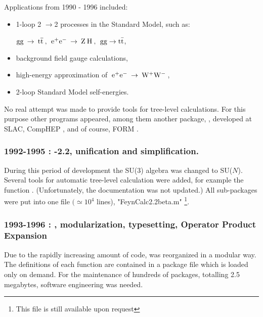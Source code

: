Applications from 1990 - 1996  included:

\begin{itemize}

\item 1-loop 2 \(\rightarrow \)2 processes in the Standard
Model, such as:

\({\rm gg}\> \rightarrow \> 
{\rm t \overline{t}} \> , \> \>
{{\rm e}^+}{{\rm e}^-}\> \rightarrow \> {\rm Z}\> {\rm H}\>, \> \>
{\rm gg} \rightarrow {\rm t\bar{t}} \),

\item background field gauge calculations,

\item high-energy approximation of \(\>{{\rm e}^+}
{{\rm e}^-}\> \rightarrow \> {{\rm W}^+}{{\rm W}^-}\> \),

\item  2-loop Standard Model self-energies.

\end{itemize}

No real attempt was made to provide tools for tree-level calculations.
For this purpose other programs appeared, among them another  \mma package, \hip \cite{yeh}, developed at SLAC, 
CompHEP \cite{Pukhov:1999gg}, and of course, FORM \cite{Vermaseren:2000nd}.

\subsubsection*{1992-1995 : -2.2, unification and simplification.}

During this period of development the SU(3) algebra was changed to SU($N$). Several tools for
automatic tree-level calculation were added, for example the function .
(Unfortunately, the  documentation was not updated.) All sub-packages were put into one file
\(\big(\simeq {{10}^4}\) lines), "FeynCalc2.2beta.m" \footnote{This file is still available upon
request}.

\subsubsection*{1993-1996 : , modularization, typesetting, Operator Product Expansion}

Due to the rapidly increasing amount of code, \fc was reorganized in a modular way. The
definitions of each function are contained in a package file which is loaded only on demand.
For the maintenance of hundreds of packages, totalling 2.5 megabytes, software engineering was
needed.

